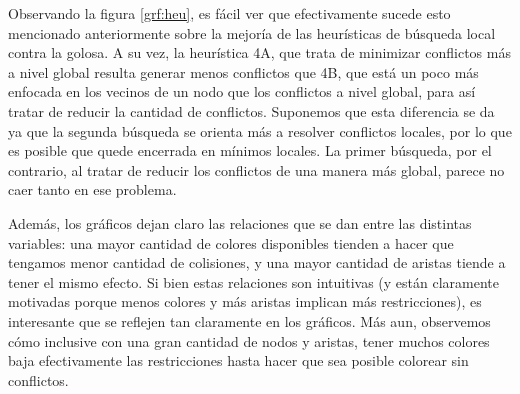\documentclass{article}
\theoremstyle{definition}
\theoremstyle{remark}
\begin{document}
Observando la figura \ref{grf:heu}, es fácil ver que efectivamente sucede esto mencionado anteriormente sobre la mejoría de las heurísticas de búsqueda local contra la golosa. A su vez, la heurística 4A, que trata de minimizar conflictos más a nivel global resulta generar menos conflictos que 4B, que está un poco más enfocada en los vecinos de un nodo que los conflictos a nivel global, para así tratar de reducir la cantidad de conflictos. Suponemos que esta diferencia se da ya que la segunda búsqueda se orienta más a resolver conflictos locales, por lo que es posible que quede encerrada en mínimos locales. La primer búsqueda, por el contrario, al tratar de reducir los conflictos de una manera más global, parece no caer tanto en ese problema.

Además, los gráficos dejan claro las relaciones que se dan entre las distintas variables: una mayor cantidad de colores disponibles tienden a hacer que tengamos menor cantidad de colisiones, y una mayor cantidad de aristas tiende a tener el mismo efecto. Si bien estas relaciones son intuitivas (y están claramente motivadas porque menos colores y más aristas implican más restricciones), es interesante que se reflejen tan claramente en los gráficos. Más aun, observemos cómo inclusive con una gran cantidad de nodos y aristas, tener muchos colores baja efectivamente las restricciones hasta hacer que sea posible colorear sin conflictos.
\end{document}
